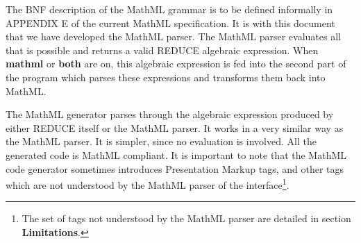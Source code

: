 \documentclass{article}
\begin{document}
The BNF description of the MathML grammar is to be defined informally in
APPENDIX E of the current MathML specification. It is with this document that
we have developed the MathML parser. The MathML parser evaluates all
that is possible and returns a valid REDUCE algebraic expression. When {\bf
mathml} or {\bf both} are on, this algebraic expression is fed into the
second part of the program which parses these expressions and transforms them
back into MathML. 

The MathML generator parses through the algebraic expression produced by
either REDUCE itself or the MathML parser. It works in a very
similar way as the MathML parser. It is simpler, since no evaluation is
involved. All the generated code is MathML compliant. It is important to note
that the MathML code generator sometimes introduces Presentation Markup tags,
and other tags which are not understood by the MathML parser of the
interface\footnote{The set of tags not understood by the MathML parser are
detailed in section {\bf Limitations}.}.
\end{document}
